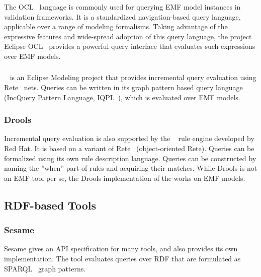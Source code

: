 The OCL~\cite{OCL} language is commonly used for querying EMF model instances in validation frameworks. It is a standardized navigation-based query language, applicable over a range of modeling formalisms. Taking advantage of the expressive features and wide-spread adoption of this query language, the project Eclipse OCL~\cite{EclipseOCL} provides a powerful query interface that evaluates such expressions over EMF models.


\subsubsection{\incquery{}}
\incquery{}~\cite{models10} is an Eclipse Modeling project that provides incremental query evaluation using Rete~\cite{rete} nets. Queries can be written in its graph pattern based query language (IncQuery Pattern Language, IQPL~\cite{iqpl}), which is evaluated over EMF models.

\subsubsection{Drools}
Incremental query evaluation is also supported by the ~\cite{Drools} rule engine developed by Red Hat. It is based on a variant of Rete~\cite{rete} (object-oriented Rete). Queries can be formalized using its own rule description language. Queries can be constructed by naming the ''when'' part of rules and acquiring their matches. While Drools is not an EMF tool per se, the Drools implementation of the \tb{} works on EMF models.

\subsection{RDF-based Tools}

\subsubsection{Sesame}
Sesame gives an API specification for many tools, and also provides its own implementation. The tool evaluates queries over RDF that are formulated as SPARQL~\cite{Sparql} graph patterns.


